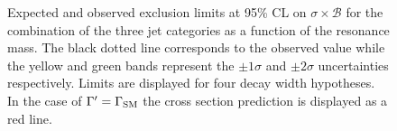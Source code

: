 \begin{figure}[htb]
{}
\caption{
    Expected and observed exclusion limits at 95\% CL on $\sigma\times\mathcal{B}$ for the combination of the three jet categories as a function of the resonance mass. The black dotted line corresponds to the observed value while the yellow and green bands represent the $\pm 1 \sigma$ and $\pm 2 \sigma$ uncertainties respectively. Limits are displayed for four decay width hypotheses. In the case of $\Gamma' = \Gamma_{\rm SM}$ the cross section prediction is displayed as a red line.}
    \label{fig:13TeVcombobslim}
\end{figure}

